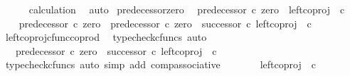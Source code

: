 \begin{isabellebody}
\ \ \ \ \isamarkupfalse%
\ calculation\ \isamarkupfalse%
\ auto\isanewline
{}\isamarkupfalse%
%
\endisatagproof
{\isafoldproof}%
%
\isadelimproof
\isanewline
%
\endisadelimproof
\isanewline
{}\isamarkupfalse%
\ predecessor{\isacharprime}{\kern0pt}{\isacharunderscore}{\kern0pt}zero{\isacharcolon}{\kern0pt}\isanewline
\ \ {\isachardoublequoteopen}predecessor{\isacharprime}{\kern0pt}\ {\isasymcirc}\isactrlsub c\ zero\ {\isacharequal}{\kern0pt}\ left{\isacharunderscore}{\kern0pt}coproj\ {\isasymone}\ {\isasymnat}\isactrlsub c{\isachardoublequoteclose}\isanewline
%
\isadelimproof
%
\endisadelimproof
%
\isatagproof
{}\isamarkupfalse%
\ {\isacharminus}{\kern0pt}\isanewline
\ \ \isamarkupfalse%
\ {\isachardoublequoteopen}predecessor{\isacharprime}{\kern0pt}\ {\isasymcirc}\isactrlsub c\ zero\ {\isacharequal}{\kern0pt}\ predecessor{\isacharprime}{\kern0pt}\ {\isasymcirc}\isactrlsub c\ {\isacharparenleft}{\kern0pt}zero\ {\isasymamalg}\ successor{\isacharparenright}{\kern0pt}\ {\isasymcirc}\isactrlsub c\ left{\isacharunderscore}{\kern0pt}coproj\ {\isasymone}\ {\isasymnat}\isactrlsub c{\isachardoublequoteclose}\isanewline
\ \ \ \ \isamarkupfalse%
\ left{\isacharunderscore}{\kern0pt}coproj{\isacharunderscore}{\kern0pt}cfunc{\isacharunderscore}{\kern0pt}coprod\ \isamarkupfalse%
\ {\isacharparenleft}{\kern0pt}typecheck{\isacharunderscore}{\kern0pt}cfuncs{\isacharcomma}{\kern0pt}\ auto{\isacharparenright}{\kern0pt}\isanewline
\ \ \isamarkupfalse%
\ \isamarkupfalse%
\ {\isachardoublequoteopen}{\isachardot}{\kern0pt}{\isachardot}{\kern0pt}{\isachardot}{\kern0pt}\ {\isacharequal}{\kern0pt}\ {\isacharparenleft}{\kern0pt}predecessor{\isacharprime}{\kern0pt}\ {\isasymcirc}\isactrlsub c\ {\isacharparenleft}{\kern0pt}zero\ {\isasymamalg}\ successor{\isacharparenright}{\kern0pt}{\isacharparenright}{\kern0pt}\ {\isasymcirc}\isactrlsub c\ left{\isacharunderscore}{\kern0pt}coproj\ {\isasymone}\ {\isasymnat}\isactrlsub c{\isachardoublequoteclose}\isanewline
\ \ \ \ \isamarkupfalse%
\ {\isacharparenleft}{\kern0pt}typecheck{\isacharunderscore}{\kern0pt}cfuncs{\isacharcomma}{\kern0pt}\ auto\ simp\ add{\isacharcolon}{\kern0pt}\ comp{\isacharunderscore}{\kern0pt}associative{}{\isacharparenright}{\kern0pt}\isanewline
\ \ \isamarkupfalse%
\ \isamarkupfalse%
\ {\isachardoublequoteopen}{\isachardot}{\kern0pt}{\isachardot}{\kern0pt}{\isachardot}{\kern0pt}\ {\isacharequal}{\kern0pt}\ left{\isacharunderscore}{\kern0pt}coproj\ {\isasymone}\ {\isasymnat}\isactrlsub c{\isachardoublequoteclose}\isanewline

\end{isabellebody}
